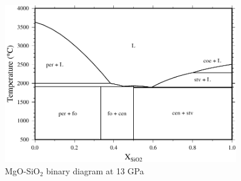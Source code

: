 \documentclass[11pt,a4paper,english]{article}
\begin{document}
\begin{figure}[!htb]
\centering
\includegraphics[width=0.9\textwidth]{figures/MS_melting_13GPa}
\caption{MgO-SiO$_2$ binary diagram at 13 GPa}
\label{fig:MS_binary}
\end{figure}

\clearpage


\end{document}
